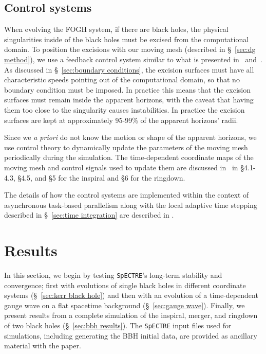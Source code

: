 \begin{bibunit}[unsrtnat]
\subsection{Control systems\label{sec:control systems}} When evolving the FOGH
system, if there are black holes, the physical singularities inside of the black
holes must be excised from the computational domain. To position the excisions
with our moving mesh (described in \S~\ref{sec:dg method}), we use a feedback
control system similar to what is presented in~\cite{Scheel:2006gg}
and~\cite{Hemberger:2012jz}. As discussed in \S~\ref{sec:boundary conditions},
the excision surfaces must have all characteristic speeds pointing out of the
computational domain, so that no boundary condition must be imposed. In practice
this means that the excision surfaces must remain inside the apparent horizons,
with the caveat that having them too close to the singularity causes
instabilities. In practice the excision surfaces are kept at approximately
95-99\% of the apparent horizons' radii.

Since we \textit{a priori} do not know the motion or shape of the apparent
horizons, we use control theory to dynamically update the parameters of
the moving mesh periodically during the simulation. The time-dependent
coordinate maps of the moving mesh and control
signals used to update them are discussed in~\cite{Hemberger:2012jz} in
\S 4.1-4.3, \S 4.5, and \S 5 for the inspiral and \S 6 for the ringdown.

The details of how the control systems are implemented within the context of
asynchronous task-based parallelism along with the local adaptive time stepping
described in \S~\ref{sec:time integration} are described in
\cite{Nelli:2025vfc}.

\section{Results\label{sec:results}}

In this section, we begin by testing \texttt{SpECTRE}'s long-term stability and
convergence; first with evolutions of single black holes in different coordinate
systems (\S~\ref{sec:kerr black hole}) and then with an evolution of a
time-dependent gauge wave on a flat spacetime background (\S~\ref{sec:gauge
wave}). Finally, we present results from a complete simulation of the inspiral,
merger, and ringdown of two black holes (\S~\ref{sec:bbh results}). The
\texttt{SpECTRE} input files used for simulations, including generating the BBH
initial data, are provided as ancillary material with the paper.


\end{bibunit}
